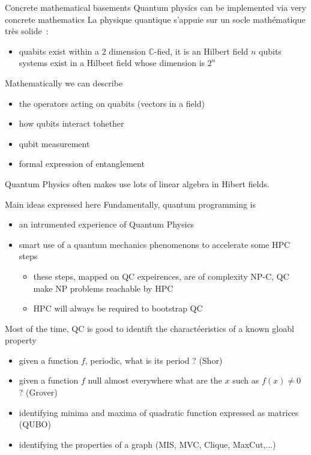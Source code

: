 \begin{frame}{Concrete mathematical basements}
Quantum physics can be implemented via very concrete mathematics
La physique quantique s'appuie sur un socle mathématique très solide~:
\begin{itemize}
    \item  quabits exist within a 2 dimension $\mathbb{C}$-fied, it is an Hilbert field
     $n$ qubits systems exist in a Hilbeet field whose dimension is $2^n$
\end{itemize}
Mathematically we can describe
\begin{itemize}
    \item the operators acting on quabits (vectors in a field)
    \item how qubits interact tohether
    \item qubit measurement
    \item formal expression of entanglement
\end{itemize}
Quantum Physics often makes use lots of linear algebra in Hibert fields.
\end{frame}

\begin{frame}{Main ideas expressed here}
Fundamentally, quantum programming is
\begin{itemize}
    \item an intrumented experience of Quantum Physics
    \item smart use of a quantum mechanics phenomenons to accelerate some HPC steps 
    \begin{itemize}
        \item these steps, mapped on QC expeirences, are of complexity NP-C, QC make NP problems reachable by HPC
        \item HPC will always be required to bootstrap QC 
    \end{itemize}
\end{itemize}
Most of the time, QC is good to identift the charactéeristics of a known gloabl property 
\begin{itemize}
    \item given a function $f$,  periodic, what is its period ? (Shor)
    \item given a function $f$  null almost everywhere what are the $x$ such as $f(x) \neq 0$ ? (Grover)
    \item identifying  minima and maxima of quadratic function expressed as matrices (QUBO)
    \item identifying the properties of a graph (MIS, MVC, Clique, MaxCut,...) 
\end{itemize}
\end{frame}


